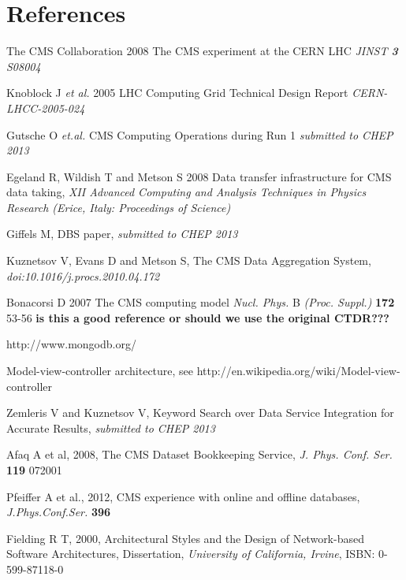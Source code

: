 \section*{References}

\begin{thebibliography}{1}
The CMS Collaboration 2008 The CMS experiment at the CERN LHC {\it JINST {\bf 3} S08004}

Knoblock J {\it et al.} 2005 LHC Computing Grid Technical Design Report {\it CERN-LHCC-2005-024}

 Gutsche O {\it et.al.} CMS Computing Operations during Run 1 {\it submitted to CHEP 2013}

  Egeland R, Wildish T and Metson S 2008 Data transfer infrastructure for CMS data taking,  {\it XII Advanced Computing and Analysis Techniques in Physics Research (Erice, Italy: Proceedings of Science)}

Giffels M, DBS paper, {\it submitted to CHEP 2013}

Kuznetsov V, Evans D and Metson S, The CMS Data Aggregation System,
{\it doi:10.1016/j.procs.2010.04.172}

 Bonacorsi D 2007 The CMS computing model {\it Nucl. Phys.} B {\it (Proc. Suppl.)} {\bf 172} 53-56
{\bf is this a good reference or should we use the original CTDR???}

http://www.mongodb.org/

 Model-view-controller architecture, see
http://en.wikipedia.org/wiki/Model-view-controller

 Zemleris V and Kuznetsov V,
Keyword Search over Data Service Integration for Accurate Results,
{\it submitted to CHEP 2013}

 Afaq A et al, 2008, The CMS Dataset Bookkeeping Service, 
{\it J. Phys. Conf. Ser.} 
{\bf 119} 072001

 Pfeiffer A et al., 2012, CMS experience with online and offline databases, 
{\it J.Phys.Conf.Ser.} 
{\bf 396}

 Fielding R T, 2000, Architectural Styles and the Design of Network-based Software Architectures, Dissertation, 
{\it University of California, Irvine}, 
ISBN: 0-599-87118-0

\end{thebibliography}
